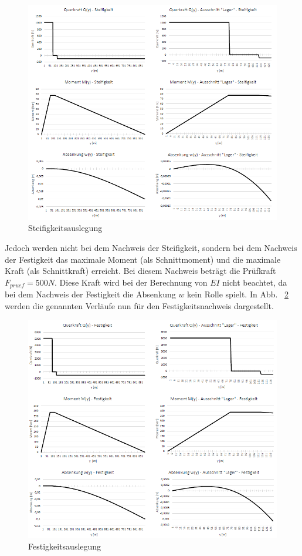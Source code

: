 \begin{figure}
	\includegraphics[width=1.0\textwidth]{Bilder/Grafiken Steifigkeit.png}
	\caption{Steifigkeitsauslegung}
	\label{fig:Steifigkeitsauslegung}
\end{figure}

\noindent Jedoch werden nicht bei dem Nachweis der Steifigkeit, sondern bei dem Nachweis der Festigkeit das maximale Moment (als Schnittmoment) und die maximale Kraft (als Schnittkraft) erreicht. Bei diesem Nachweis beträgt die Prüfkraft $F_{pruef} = 500N$. Diese Kraft wird bei der Berechnung von $EI$ nicht beachtet, da bei dem Nachweis der Festigkeit die Absenkung $w$ kein Rolle spielt. In Abb. ~\ref{fig:Festigkeitsauslegung} werden die genannten Verläufe nun für den Festigkeitsnachweis dargestellt.
\begin{figure}
	\includegraphics[width=1.0\textwidth]{Bilder/Grafiken Festigkeit.png}
	\caption{Festigkeitsauslegung}
	\label{fig:Festigkeitsauslegung}
\end{figure}

